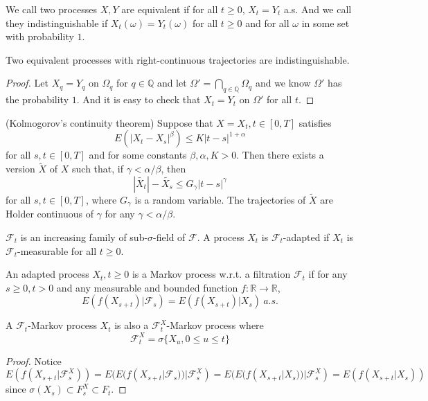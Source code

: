 \documentclass[lang=en, color=blue, ]{elegantbook}
\newcommand{\F}{\mathcal{F}}
\newcommand{\R}{\mathbb{R}}
\newcommand{\Q}{\mathbb{Q}}
\begin{document}
\begin{definition}
    We call two processes $X,Y$ are  equivalent if for all $t\geq 0$, $X_t = Y_t$ a.s. And we call they indistinguishable if $X_t(\omega) = Y_t(\omega)$ for all $t\geq 0$ and for all $\omega$ in some set with probability $1$.
\end{definition}

\begin{proposition}
    Two equivalent processes with right-continuous trajectories are indistinguishable.
\end{proposition}
\begin{proof}
    Let $X_q = Y_q$ on $\Omega_q$ for $q\in\Q$ and let $\Omega' = \bigcap_{q\in\Q}\Omega_q$ and we know $\Omega'$ has the probability $1$. And it is easy to check that $X_t = Y_t$ on $\Omega '$ for all $t$.
\end{proof}

\begin{theorem}(Kolmogorov's continuity theorem)
    Suppose that $X = X_t, t\in[0,T]$ satisfies
    \[ E(|X_t-X_s|^{\beta}) \leq K|t-s|^{1+\alpha}\]
    for all $s,t\in [0,T]$ and for some constants $\beta,\alpha,K>0$. Then there exists a version $\tilde{X}$ of $X$ such that, if $\gamma < \alpha/\beta$, then
    \[|\tilde{X_t}|-\tilde{X_s} \leq G_{\gamma}|t-s|^{\gamma}\]
    for all $s,t\in[0,T]$, where $G_{\gamma}$ is a random variable. The trajectories of $\tilde{X}$ are Holder continuous of $\gamma$ for any $\gamma < \alpha/\beta$.
\end{theorem}

\begin{definition}
    $\F_t$ is an increasing family of sub-$\sigma$-field of $\F$. A process $X_t$ is $\F_t$-adapted if $X_t$ is $\F_t$-measurable for all $t\geq 0$.
\end{definition}

\begin{definition}
    An adapted process $X_t,t\geq 0$ is a Markov process w.r.t.  a filtration $\F_t$ if for any $s\geq 0, t>0$ and any measurable and bounded function $f:\R\to\R$,
    \[E(f(X_{s+t})|\F_s) = E(f(X_{s+t})|X_s)\ a.s.\]
\end{definition}

\begin{proposition}
    A $\F_t$-Markov process $X_t$ is also a $\F_t^X$-Markov process where
    \[\F_t^X = \sigma\{X_u, 0\leq u \leq t\}\]
\end{proposition}
\begin{proof}
    Notice
    \[E(f(X_{s+t}|\F_s^X)) = E(E(f(X_{s+t}|\F_s))|\F_s^X) = E(E(f(X_{s+t}|X_s))|\F_s^X) = E(f(X_{s+t}|X_s))\]
    since $\sigma(X_s) \subset F_s^X \subset F_t$.
\end{proof}
\end{document}
